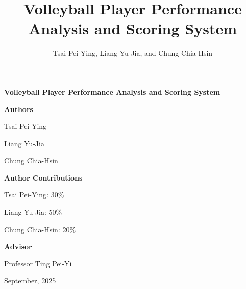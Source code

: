 \documentclass[journal]{IEEEtran}
\begin{document}
\begin{titlepage}
    \centering
    \vspace*{2cm} %
    
    {\Huge\bfseries Volleyball Player Performance Analysis and Scoring System\par}
    
    \vspace{2cm}
    
    {\Large \textbf{Authors}\par}
    \vspace{0.5cm}
    {\large Tsai Pei-Ying\par}
    {\large Liang Yu-Jia\par}
    {\large Chung Chia-Hsin\par}
    
    \vspace{1.5cm}
    
    {\Large \textbf{Author Contributions}\par}
    \vspace{0.5cm}
    {\large Tsai Pei-Ying: 30\%\par}
    {\large Liang Yu-Jia: 50\%\par}
    {\large Chung Chia-Hsin: 20\%\par}
    
    \vspace{2cm}
    
    {\Large \textbf{Advisor}\par}
    \vspace{0.5cm}
    {\large Professor Ting Pei-Yi\par}
    
    \vfill %
    
    {\large September, 2025\par}
\end{titlepage}

\title{Volleyball Player Performance Analysis and Scoring System}

\author{
    Tsai Pei-Ying, Liang Yu-Jia, and Chung Chia-Hsin
}


\maketitle
\end{document}
